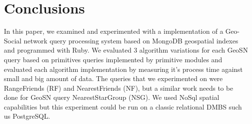 \documentclass[prodmode,acmtods]{acmsmall} %
\begin{document}
\section{Conclusions}
In this paper, we examined and experimented with a implementation of a Geo-Social network 
query processing system based on MongoDB geospatial indexes and programmed with Ruby. 
We evaluated 3 algorithm variations for each GeoSN query based on primitives queries implemented by primitive modules and evaluated each algorithm
implementation by measuring it's process time against small and big amount of data. The queries that we experimented on were RangeFriends (RF) and NearestFriends (NF),
but a similar work needs to be done for GeoSN query NearestStarGroup (NSG). We used NoSql spatial capabilities but this experiment could be run on a 
classic relational DMBS such us PostgreSQL.



%

\end{document}
